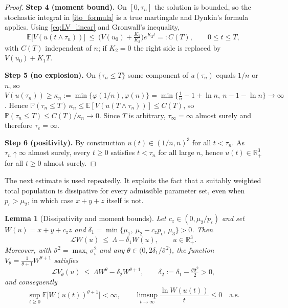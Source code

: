 \documentclass{article}
\newtheorem{lemma}{Lemma}[section]
\newcommand{\peps}{p_\epsilon}
\begin{document}
\begin{proof}
\textbf{Step 4 (moment bound).} On $[0,\tau_n]$ the solution is bounded, so the stochastic integral in \eqref{ito_formula} is a true martingale and Dynkin's formula applies. Using \eqref{eq:LV_linear} and Gronwall's inequality,
\begin{equation}\label{boundV}
\mathbb{E}\big[V(u(t\wedge\tau_n))\big]\ \le\ \Big(V(u_0)+\tfrac{K_1}{K_2}\Big)e^{K_2t}=:C(T),\qquad 0\le t\le T,
\end{equation}
with $C(T)$ independent of $n$; if $K_2=0$ the right side is replaced by $V(u_0)+K_1T$.

\textbf{Step 5 (no explosion).} On $\{\tau_n\le T\}$ some component of $u(\tau_n)$ equals $1/n$ or $n$, so
$V(u(\tau_n))\ge \kappa_n:=\min\{\varphi(1/n),\varphi(n)\}=\min\{\tfrac1n-1+\ln n,\ n-1-\ln n\}\to\infty$.
Hence $\mathbb{P}(\tau_n\le T)\,\kappa_n\le\mathbb{E}[V(u(T\wedge\tau_n))]\le C(T)$, so $\mathbb{P}(\tau_n\le T)\le C(T)/\kappa_n\to0$. Since $T$ is arbitrary, $\tau_\infty=\infty$ almost surely and therefore $\tau_e=\infty$.

\textbf{Step 6 (positivity).} By construction $u(t)\in(1/n,n)^3$ for all $t<\tau_n$. As $\tau_n\uparrow\infty$ almost surely, every $t\ge0$ satisfies $t<\tau_n$ for all large $n$, hence $u(t)\in\mathbb{R}^3_+$ for all $t\ge0$ almost surely.
\end{proof}

The next estimate is used repeatedly. It exploits the fact that a suitably weighted total population is dissipative for every admissible parameter set, even when $\peps>\mu_2$, in which case $x+y+z$ itself is not.

\begin{lemma}[Dissipativity and moment bounds]\label{lem:dissip}
Let $c_z\in(0,\mu_2/\peps)$ and set $W(u)=x+y+c_zz$ and $\delta_1=\min\{\mu_1,\ \mu_2-c_z\peps,\ \mu_3\}>0$. Then
\begin{equation}\label{eq:LW}
\mathcal{L}W(u)\ \le\ \Lambda-\delta_1 W(u),\qquad u\in\mathbb{R}^3_+ .
\end{equation}
Moreover, with $\bar\sigma^2=\max_i\sigma_i^2$ and any $\theta\in\big(0,2\delta_1/\bar\sigma^2\big)$, the function $V_\theta=\tfrac{1}{\theta+1}W^{\theta+1}$ satisfies
\begin{equation}\label{eq:LVtheta}
\mathcal{L}V_\theta(u)\ \le\ \Lambda W^\theta-\delta_2W^{\theta+1},\qquad \delta_2:=\delta_1-\tfrac{\theta\bar\sigma^2}{2}>0,
\end{equation}
and consequently
\[
\sup_{t\ge0}\mathbb{E}\big[W(u(t))^{\theta+1}\big]<\infty,\qquad
\limsup_{t\to\infty}\frac{\ln W(u(t))}{t}\le 0 \quad\text{a.s.}
\]
\end{lemma}
\end{document}
